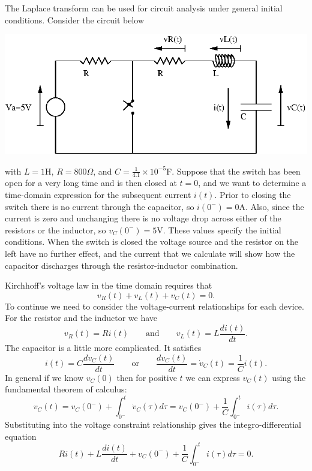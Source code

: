 \documentclass[10pt]{beamer}
\begin{document}
The Laplace transform can be used for circuit analysis under general initial conditions.  Consider the circuit below
\begin{center}
  \includegraphics{circuitexlaptr}
\end{center}
with $L=1$H, $R=800\Omega$, and $C=\frac{1}{4.1} \times 10^{-5}$F.  
Suppose that the switch has been open for a very long time and is then closed at $t=0$, and we want to determine a time-domain expression for the subsequent current $i(t)$.  Prior to closing the switch there is no current through the capacitor, so $i(0^-) = 0$A.  Also, since the current is zero and unchanging there is no voltage drop across either of the resistors or the inductor, so $v_C(0^-) = 5$V.  These values specify the initial conditions.  When the switch is closed the voltage source and the resistor on the left have no further effect, and the current that we calculate will show how the capacitor discharges through the resistor-inductor combination.

Kirchhoff's voltage law in the time domain requires that
\begin{equation*}
  v_R(t) + v_L(t) + v_C(t) = 0.
\end{equation*}
To continue we need to consider the voltage-current relationships for each device.  For the resistor and the inductor we have
\begin{equation*}
  v_R(t) = R i(t) \qquad \text{and} \qquad v_L(t) = L \frac{di(t)}{dt}.
\end{equation*}
The capacitor is a little more complicated.  It satisfies
\begin{equation*}
  i(t) = C \frac{dv_C(t)}{dt} \qquad \text{or} \qquad \frac{dv_C(t)}{dt} = \dot{v}_C(t) = \frac{1}{C} i(t).
\end{equation*}
In general if we know $v_C(0)$ then for positive $t$ we can express $v_C(t)$ using the fundamental theorem of calculus:
\begin{equation*}
  v_C(t) = v_C(0^-) + \int_{0^-}^t \dot{v}_C(\tau) d\tau = v_C(0^-) + \frac{1}{C} \int_{0^-}^t i(\tau) d\tau.
\end{equation*}
Substituting into the voltage constraint relationship gives the integro-differential equation
\begin{equation*}
  R i(t) + L \frac{di(t)}{dt} + v_C(0^-) + \frac{1}{C} \int_{0^-}^t i(\tau) d\tau = 0.
\end{equation*}
\end{document}
